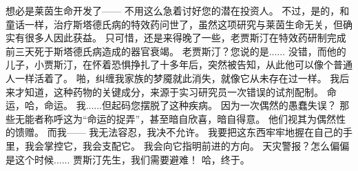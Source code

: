 \documentclass[openany]{book}
\begin{document}
\begin{dialogue}
     想必是莱茵生命开发了——
     不用这么急着讨好您的潜在投资人。
     不过，是的，和童话一样，治疗斯塔德氏病的特效药问世了，虽然这项研究与莱茵生命无关，但确实有很多人因此获益。
     只可惜，还是来得晚了一些，老贾斯汀在特效药研制完成前三天死于斯塔德氏病造成的器官衰竭。
     老贾斯汀？您说的是......
     没错，而他的儿子，小贾斯汀，在怀着恐惧挣扎了十多年后，突然被告知，从此他可以像个普通人一样活着了。
     啪，纠缠我家族的梦魇就此消失，就像它从未存在过一样。
     我后来才知道，这种药物的关键成分，来源于实习研究员一次错误的试剂配制。
     命运，哈，命运。
     我......但起码您摆脱了这种疾病。
     因为一次偶然的愚蠢失误？
     那些无能者称呼这为“命运的捉弄”，甚至暗自欣喜，暗自得意。
     他们视其为偶然性的馈赠。
     而我——
     我无法容忍，我决不允许。
     我要把这东西牢牢地握在自己的手里，我会掌控它，我会支配它。
     我会向它指明前进的方向。
     天灾警报？怎么偏偏是这个时候......
     贾斯汀先生，我们需要避难！
     哈，终于。
\end{dialogue}
\end{document}
